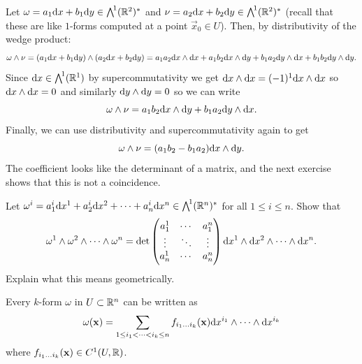 \documentclass[11pt,a4paper]{article}
\begin{document}
\begin{example}
  Let $\omega = a_1 \dx + b_1 \dy \in \bigwedge^{\!1}(\R^2)^*$
  and $\nu = a_2 \dx + b_2 \dy \in \bigwedge^{\!1}(\R^2)^*$
  (recall that these are like $1$-forms computed at a point $\vec x_0 \in U$).
  Then, by distributivity of the wedge product:
  \[
    \omega \wedge \nu =
    (a_1 \dx + b_1 \dy) \wedge (a_2 \dx + b_2 \dy) =
    a_1 a_2 \dx \wedge \dx +
    a_1 b_2 \dx \wedge \dy +
    b_1 a_2 \dy \wedge \dx +
    b_1 b_2 \dy \wedge \dy.
  \]
  Since $\dx \in \bigwedge^{\!1}(\R^1)$ by supercommutativity we get
  $\dx \wedge \dx = (-1)^{1} \dx \wedge \dx$ so
  $\dx \wedge \dx = 0$ and similarly $\dy \wedge \dy = 0$
  so we can write
  \[
    \omega \wedge \nu =
    a_1 b_2 \dx \wedge \dy +
    b_1 a_2 \dy \wedge \dx.
  \]
  Finally, we can use distributivity and supercommutativity again to get
  \[
    \omega \wedge \nu =
    (a_1 b_2 - b_1 a_2) \dx \wedge \dy.
  \]
  The coefficient looks like the determinant of a matrix,
  and the next exercise shows that this is not a coincidence.
\end{example}

\begin{exercise}
  \label{ex:wedge-of-one-forms-identity}
  Let $\omega^i = a_1^i \dx^1 + a_2^i \dx^2 + \cdots + a_n^i \dx^n \in
  \bigwedge^{\!1}(\R^n)^*$ for all $1 \le i \le n$.
  Show that
  \[
    \omega^1 \wedge \omega^2 \wedge \cdots \wedge \omega^n =
    \det
    \begin{pmatrix}
      a_1^1 & \cdots & a_1^n \\
      \vdots & \ddots & \vdots \\
      a_n^1 & \cdots & a^n_n
    \end{pmatrix}
    \dx^1 \wedge \dx^2 \wedge \cdots \wedge \dx^n.
  \]
  Explain what this means geometrically.
\end{exercise}

\begin{corollary}
  Every $k$-form $\omega$ in $U \subset \mathbb{R}^n$ can be written as
  \[
    \omega(\vec x) =
    \sum_{1 \le i_1 < \cdots < i_k \le n}
    f_{i_1 \dots i_k}(\vec x) \dx^{i_1} \wedge \cdots \wedge \dx^{i_k}
  \]
  where $f_{i_1 \dots i_k}(\boldsymbol{\mathbf{x}}) \in C^1(U,\mathbb{R})$.
\end{corollary}
\end{document}
